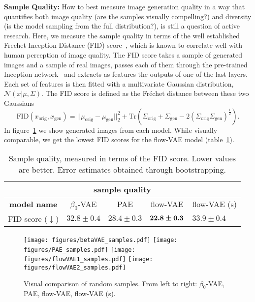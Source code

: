 \documentclass[10pt]{article} \usepackage[accepted]{tmlr}
\def\bi#1{\hbox{\boldmath{$#1$}}}
\begin{document}
\textbf{Sample Quality:} How to best measure image generation quality in a way that quantifies both image quality (are the samples visually compelling?) and diversity (is the model sampling from the full distribution?), is still a question of active research. Here, we measure the sample quality in terms of the well established Frechet-Inception Distance (FID) score~\citep{FID_Heusel}, which is known to correlate well with human perception of image quality. The FID score takes a sample of generated images and a sample of real images, passes each of them through the pre-trained Inception network~\citep{SzegedyVISW16} and extracts as features the outputs of one of the last layers. Each set of features is then fitted with a multivariate Gaussian distribution, $\mathcal{N}(x|\mu,\Sigma)$. The FID score is defined as the Fréchet distance between these two Gaussians
\begin{equation}
\label{eq:FID}
\mathrm{FID}(x_\mathrm{orig},x_\mathrm{gen}) =||\mu_{\mathrm{orig}}-\mu_{\mathrm{gen}}||^2_2+ \mathrm{Tr}\left(\Sigma_{\mathrm{orig}}+\Sigma_{\mathrm{gen}}-2(\Sigma_{\mathrm{orig}}\Sigma_{\mathrm{gen}})^\frac{1}{2}\right).
\end{equation}
In figure~\ref{fig:samples} we show generated images from each model. While visually comparable, we get the lowest FID scores for the flow-VAE model (table~\ref{tab:sample_qual}).
\begin{table}[h]
\begin{center}
\begin{tabular}{lllll}
\multicolumn{5}{c}{\textbf{sample quality}}                                                                      \\ \hline
\multicolumn{1}{c|}{\textbf{model name}}   & \multicolumn{1}{c|}{$\beta_0$-VAE} & \multicolumn{1}{c|}{PAE}         & \multicolumn{1}{c|}{flow-VAE} & \multicolumn{1}{c}{flow-VAE (s)} \\ \hline
\multicolumn{1}{l|}{FID score ($\downarrow$)} & \multicolumn{1}{l|}{$32.8\pm0.4$}       & \multicolumn{1}{l|}{$28.4\pm0.3$} &      \multicolumn{1}{l|}{$\bi{22.8\pm0.3}$}         & $33.9\pm0.4$             \\
\end{tabular}
\end{center}
\caption{\label{tab:sample_qual} Sample quality, measured in terms of the FID score. Lower values are better. Error estimates obtained through bootstrapping. }
\end{table}
\begin{figure}
\texttt{[image: figures/betaVAE\_samples.pdf]}
\texttt{[image: figures/PAE\_samples.pdf]}
\texttt{[image: figures/flowVAE1\_samples.pdf]}
\texttt{[image: figures/flowVAE2\_samples.pdf]}
\caption{Visual comparison of random samples. From left to right: $\beta_0$-VAE, PAE, flow-VAE, flow-VAE (s).}
\label{fig:samples}
\end{figure}
\end{document}
